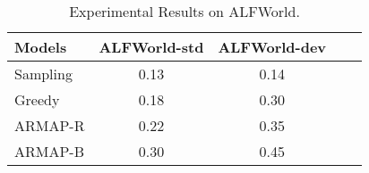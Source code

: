 \begin{table*}[!h]
    \centering
    \begin{tabular}{lcccc}
    \toprule
    Models    & ALFWorld-std & ALFWorld-dev \\
    \midrule
    Sampling  & 0.13      & 0.14 &  \\
    Greedy  & 0.18      & 0.30 &  \\
    ARMAP-R & 0.22 & 0.35  \\
    ARMAP-B & 0.30 &  0.45 \\
    \bottomrule
    \end{tabular}
    \caption{Experimental Results on ALFWorld.}
    \label{tab:alfworld}
\end{table*}